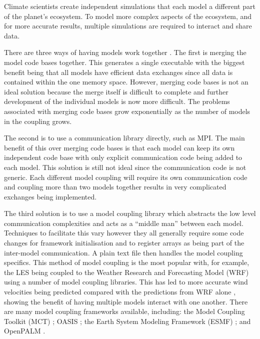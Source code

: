Climate scientists create independent simulations that each model a different
part of the planet's ecosystem. To model more complex aspects of the ecosystem,
and for more accurate results, multiple simulations are required to interact and
share data.

There are three ways of having models work together \cite{Thevenin}. The first
is merging the model code bases together. This generates a single executable
with the biggest benefit being that all models have efficient data exchanges
since all data is contained within the one memory space. However, merging code
bases is not an ideal solution because the merge itself is difficult to complete
and further development of the individual models is now more difficult. The
problems associated with merging code bases grow exponentially as the number of
models in the coupling grows.

The second is to use a communication library directly, such as MPI. The main
benefit of this over merging code bases is that each model can keep its own
independent code base with only explicit communication code being added to each
model. This solution is still not ideal since the communication code is not
generic. Each different model coupling will require its own communication code
and coupling more than two models together results in very complicated exchanges
being implemented.

The third solution is to use a model coupling library which abstracts the low
level communication complexities and acts as a ``middle man'' between each
model. Techniques to facilitate this vary however they all generally require
some code changes for framework initialisation and to register arrays as being
part of the inter-model communication. A plain text file then handles the model
coupling specifics. This method of model coupling is the most popular with, for
example, the LES being coupled to the Weather Research and Forecasting Model
(WRF) using a number of model coupling libraries. This has led to more accurate
wind velocities being predicted compared with the predictions from WRF alone
\cite{Kinbara2010,Nakayama1998}, showing the benefit of having multiple models
interact with one another. There are many model coupling frameworks available,
including: the Model Coupling Toolkit (MCT) \cite{Jacob2005,Larson2005}; OASIS
\cite{Valcke2013,Valcke}; the Earth System Modeling Framework (ESMF)
\cite{Ramework2004}; and OpenPALM \cite{Piacentini2011}.
